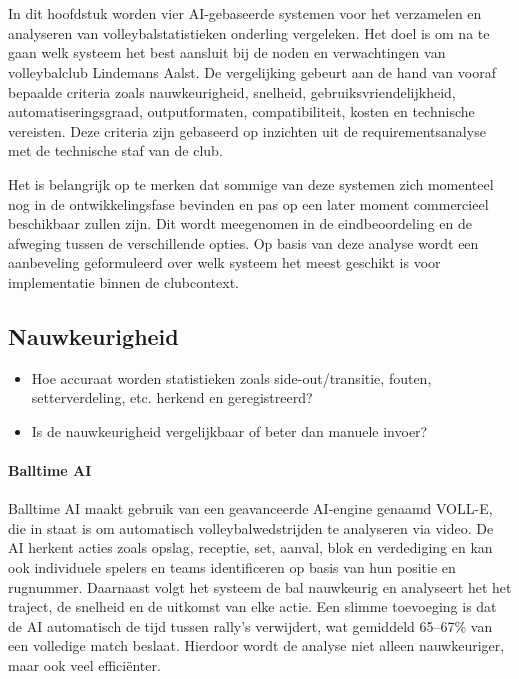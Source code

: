 \chapter{}%
\label{ch:vergelijkendestudie}
In dit hoofdstuk worden vier AI-gebaseerde systemen voor het verzamelen en analyseren van volleybalstatistieken onderling vergeleken. Het doel is om na te gaan welk systeem het best aansluit bij de noden en verwachtingen van volleybalclub Lindemans Aalst. De vergelijking gebeurt aan de hand van vooraf bepaalde criteria zoals nauwkeurigheid, snelheid, gebruiksvriendelijkheid, automatiseringsgraad, outputformaten, compatibiliteit, kosten en technische vereisten. Deze criteria zijn gebaseerd op inzichten uit de requirementsanalyse met de technische staf van de club.

Het is belangrijk op te merken dat sommige van deze systemen zich momenteel nog in de ontwikkelingsfase bevinden en pas op een later moment commercieel beschikbaar zullen zijn. Dit wordt meegenomen in de eindbeoordeling en de afweging tussen de verschillende opties. Op basis van deze analyse wordt een aanbeveling geformuleerd over welk systeem het meest geschikt is voor implementatie binnen de clubcontext.

\section{Nauwkeurigheid}
\begin{itemize}
  \item Hoe accuraat worden statistieken zoals side-out/transitie, fouten, setterverdeling, etc. herkend en geregistreerd?
  \item Is de nauwkeurigheid vergelijkbaar of beter dan manuele invoer?
\end{itemize}
\subsubsection{Balltime AI}
Balltime AI maakt gebruik van een geavanceerde AI-engine genaamd VOLL-E, die in staat is om automatisch volleybalwedstrijden te analyseren via video. De AI herkent acties zoals opslag, receptie, set, aanval, blok en verdediging en kan ook individuele spelers en teams identificeren op basis van hun positie en rugnummer. Daarnaast volgt het systeem de bal nauwkeurig en analyseert het het traject, de snelheid en de uitkomst van elke actie. Een slimme toevoeging is dat de AI automatisch de tijd tussen rally's verwijdert, wat gemiddeld 65–67\% van een volledige match beslaat. Hierdoor wordt de analyse niet alleen nauwkeuriger, maar ook veel efficiënter.
